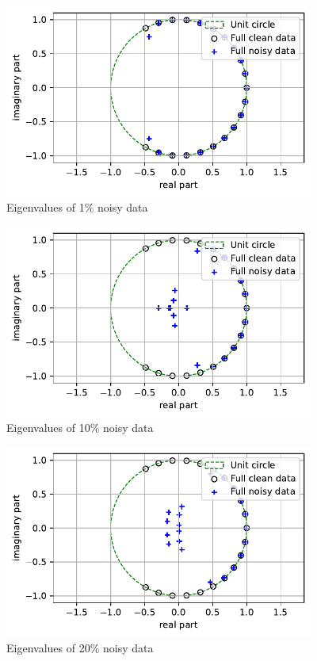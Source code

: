 \documentclass[11pt]{article}
\begin{document}
\begin{figure}[H]
    \centering
    \includegraphics[width=4in]{fig1b_eigs_1.pdf}
    \caption{Eigenvalues of 1\% noisy data}
    \label{fig1b4}
\end{figure}

\begin{figure}[H]
    \centering
    \includegraphics[width=4in]{fig1b_eigs_2.pdf}
    \caption{Eigenvalues of 10\% noisy data}
    \label{fig1b5}
\end{figure}

\begin{figure}[H]
    \centering
    \includegraphics[width=4in]{fig1b_eigs_3.pdf}
    \caption{Eigenvalues of 20\% noisy data}
    \label{fig1b6}
\end{figure}
\end{document}
